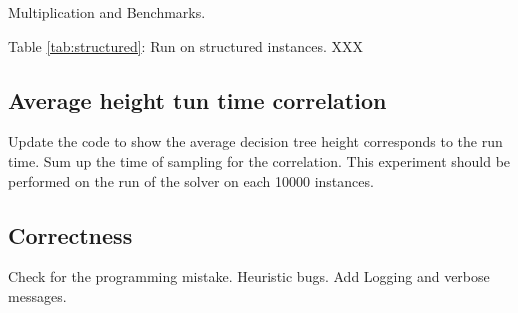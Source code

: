 \documentclass[runningheads]{llncs}
\begin{document}
Multiplication and Benchmarks. \\

\begin{table}[]
	\centering
	\caption{Sampling score of 10,000 runs of each decision heuristic on random instances}
	\label{tab:structured}
\end{table}


Table \ref{tab:structured}: Run on structured instances. XXX
%
%

\subsection{Average height tun time correlation}
Update the code to show the average decision tree height corresponds to the run time. Sum up the time of sampling for the correlation. This experiment should be performed on the run of the solver on each 10000 instances.

\subsection{Correctness}
Check for the programming mistake. Heuristic bugs. Add Logging and verbose messages.
   
\end{document}
